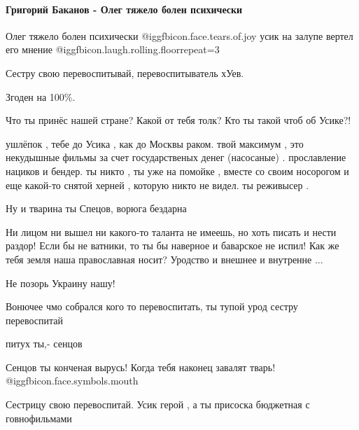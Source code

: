  
 
 
 
 
\paragraph{Григорий Баканов - Олег тяжело болен психически}

\begin{itemize} %

Олег тяжело болен психически  @igg{fbicon.face.tears.of.joy}  усик на залупе
вертел его мнение  @igg{fbicon.laugh.rolling.floor}{repeat=3} 

Сестру свою перевоспитывай, перевоспитыватель хУев.

Згоден на 100\%.

Что ты принёс нашей стране? Какой от тебя толк? Кто ты такой чтоб об Усике?!


ушлёпок , тебе до Усика , как до Москвы раком. твой максимум , это некудышные
фильмы за счет государственых денег (насосаные) . прославление нациков и
бендер. ты никто , ты уже на помойке , вместе со своим носорогом и еще какой-то
снятой херней , которую никто не видел. ты реживысер .

Ну и тварина ты Спецов, ворюга бездарна


Ни лицом ни вышел ни какого-то таланта не имеешь, но хоть писать и нести
раздор! Если бы не ватники, то ты бы наверное и баварское не испил! Как же тебя
земля наша православная носит? Уродство и внешнее и внутренне ...

Не позорь Украину нашу!


Вонючее чмо собрался кого то перевоспитать, ты тупой урод сестру перевоспитай

питух ты,- сенцов

Сенцов ты конченая вырусь! Когда тебя наконец завалят тварь! @igg{fbicon.face.symbols.mouth} 

Сестрицу свою перевоспитай. Усик герой , а ты присоска бюджетная с говнофильмами


\end{itemize}
